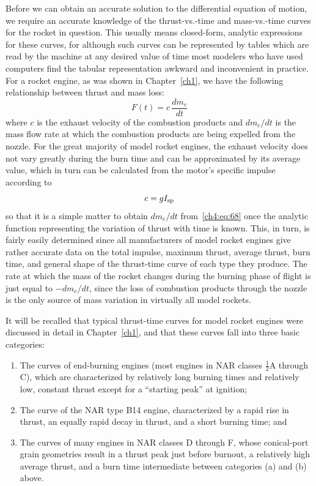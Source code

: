 Before we can obtain an accurate solution to the differential equation of motion, we require an accurate
knowledge of the thrust-vs.-time and mass-vs.-time curves for the rocket in question. This usually means
closed-form, analytic expressions for these curves, for although such curves can be represented by tables
which are read by the machine at any desired value of time most modelers who have used computers find the
tabular representation awkward and inconvenient in practice. For a rocket engine, as was shown in
Chapter~\ref{ch1}, we have the following relationship between thrust and mass loss:
\begin{equation}\label{ch4:eq:68}
F(t) = c\,\frac{dm_e}{dt}
\end{equation}
where $c$ is the exhaust velocity of the combustion products and $dm_e/dt$ is the mass flow rate at which
the combustion products are being expelled from the nozzle. For the great majority of model rocket engines,
the exhaust velocity does not vary greatly during the burn time and can be approximated by its average
value, which in turn can be calculated from the motor's specific impulse according to
\begin{equation}\label{ch4:eq:69}
c = gI_{\mathrm{sp}}
\end{equation}
so that it is a simple matter to obtain $dm_e/dt$ from~\eqref{ch4:eq:68} once the analytic function
representing the variation of thrust with time is known. This, in turn, is fairly easily determined since
all manufacturers of model rocket engines give rather accurate data on the total impulse, maximum thrust,
average thrust, burn time, and general shape of the thrust-time curve of each type they produce. The rate
at which the mass of the rocket changes during the burning phase of flight is just equal to $-dm_e/dt$,
since the loss of combustion products through the nozzle is the only source of mass variation in virtually
all model rockets.

It will be recalled that typical thrust-time curves for model rocket engines were discussed in detail in
Chapter~\ref{ch1}, and that these curves fall into three basic categories:
\begin{enumerate}[label=(\alph*)]
  \item The curves of end-burning engines (most engines in NAR classes $\tfrac{1}{2}$A through C), which
    are characterized by relatively long burning times and relatively low, constant thrust except for a
    ``starting peak'' at ignition;
  \item The curve of the NAR type B14 engine, characterized by a rapid rise in thrust, an equally rapid
    decay in thrust, and a short burning time; and
  \item The curves of many engines in NAR classes D through F, whose conical-port grain geometries result in
    a thrust peak just before burnout, a relatively high average thrust, and a burn time intermediate
    between categories (a) and (b) above.
\end{enumerate}


